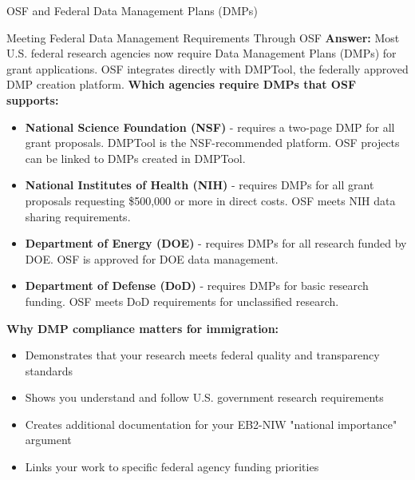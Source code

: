 \documentclass[11pt]{beamer}
\begin{document}
	\begin{frame}{OSF and Federal Data Management Plans (DMPs)}
		\scriptsize
		\begin{block}{Meeting Federal Data Management Requirements Through OSF}
			\textbf{Answer:} Most U.S. federal research agencies now require Data Management Plans (DMPs) for grant applications. OSF integrates directly with DMPTool, the federally approved DMP creation platform.
			\vspace{0.1cm}
			\textbf{Which agencies require DMPs that OSF supports:}
			\begin{itemize}
				\item \textbf{National Science Foundation (NSF)} - requires a two-page DMP for all grant proposals. DMPTool is the NSF-recommended platform. OSF projects can be linked to DMPs created in DMPTool.
				\item \textbf{National Institutes of Health (NIH)} - requires DMPs for all grant proposals requesting \$500,000 or more in direct costs. OSF meets NIH data sharing requirements.
				\item \textbf{Department of Energy (DOE)} - requires DMPs for all research funded by DOE. OSF is approved for DOE data management.
				\item \textbf{Department of Defense (DoD)} - requires DMPs for basic research funding. OSF meets DoD requirements for unclassified research.
			\end{itemize}
			\textbf{Why DMP compliance matters for immigration:}
			\begin{itemize}
				\item Demonstrates that your research meets federal quality and transparency standards
				\item Shows you understand and follow U.S. government research requirements
				\item Creates additional documentation for your EB2-NIW "national importance" argument
				\item Links your work to specific federal agency funding priorities
			\end{itemize}
		\end{block}
	\end{frame}
	
\end{document}
